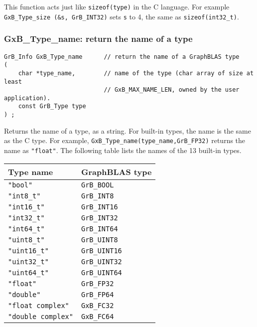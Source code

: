 \documentclass[12pt]{article}
\begin{document}
{This function acts just like \verb'sizeof(type)' in the C language.  For
example \verb'GxB_Type_size (&s, GrB_INT32)' sets \verb's' to 4, the same as
\verb'sizeof(int32_t)'.

\newpage
\subsubsection{{\sf GxB\_Type\_name:} return the name of a type}
\label{type_name}

\begin{mdframed}[userdefinedwidth=6in]
{\footnotesize
\begin{verbatim}
GrB_Info GxB_Type_name      // return the name of a GraphBLAS type
(
    char *type_name,        // name of the type (char array of size at least
                            // GxB_MAX_NAME_LEN, owned by the user application).
    const GrB_Type type
) ;
\end{verbatim}
}\end{mdframed}

Returns the name of a type, as a string.  For built-in types, the name is
the same as the C type.  For example, \verb'GxB_Type_name(type_name,GrB_FP32)'
returns the name as \verb'"float"'.  The following table lists the
names of the 13 built-in types.

\vspace{0.2in}
{\small
\begin{tabular}{ll}
\hline
Type name & GraphBLAS type \\
\hline
    \verb'"bool"'           & \verb'GrB_BOOL' \\
    \verb'"int8_t"'         & \verb'GrB_INT8' \\
    \verb'"int16_t"'        & \verb'GrB_INT16' \\
    \verb'"int32_t"'        & \verb'GrB_INT32' \\
    \verb'"int64_t"'        & \verb'GrB_INT64' \\
    \verb'"uint8_t"'        & \verb'GrB_UINT8' \\
    \verb'"uint16_t"'       & \verb'GrB_UINT16' \\
    \verb'"uint32_t"'       & \verb'GrB_UINT32' \\
    \verb'"uint64_t"'       & \verb'GrB_UINT64' \\
    \verb'"float"'          & \verb'GrB_FP32' \\
    \verb'"double"'         & \verb'GrB_FP64' \\
    \verb'"float complex"'  & \verb'GxB_FC32' \\
    \verb'"double complex"' & \verb'GxB_FC64' \\
\hline
\end{tabular}}

}
\end{document}
